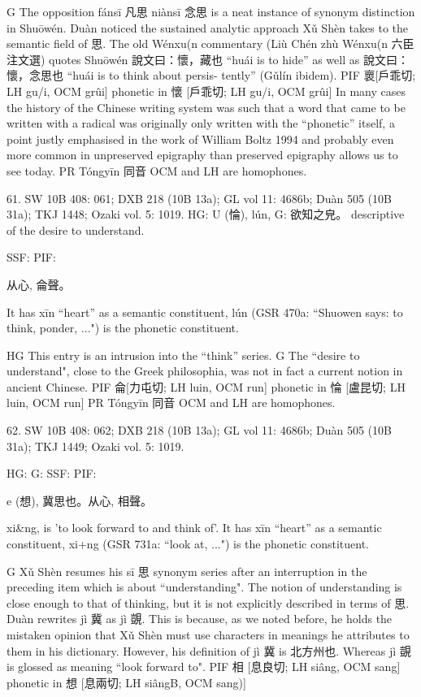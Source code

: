 G The opposition fánsī 凡思 niànsī 念思 is a neat instance of synonym distinction in Shuōwén. Duàn noticed the sustained analytic approach Xǔ Shèn takes to the semantic field of 思.
    The old Wénxu(n commentary (Liù Chén zhù Wénxu(n 六臣注文選) quotes Shuōwén 說文曰：懷，藏也 ``huái is to hide'' as well as 說文曰：懷，念思也 ``huái is to think about persis- tently'' (Gǔlín ibidem).
PIF     褱[戶乖切; LH gu/i, OCM grûi] phonetic in 懷 [戶乖切; LH gu/i, OCM grûi]
    In many cases the history of the Chinese writing system was such that a word that came to be written with a radical was originally only written with the ``phonetic'' itself, a point justly emphasised in the work of William Boltz 1994 and probably even more common in unpreserved epigraphy than preserved epigraphy allows us to see today.
PR   Tóngyīn 同音 OCM and LH are homophones.

61. SW 10B 408: 061; DXB 218 (10B 13a); GL vol 11: 4686b; Duàn 505 (10B 31a); TKJ 1448; Ozaki vol. 5: 1019.
HG:   U (惀),	lún,
G:	欲知之皃。 descriptive of the desire to understand.

SSF: PIF:

从心, 侖聲。

It has xīn ``heart'' as a semantic constituent,
lún (GSR 470a: ``Shuowen says: to think, ponder, ...") is the phonetic constituent.

HG This entry is an intrusion into the ``think'' series.
G	The ``desire to understand", close to the Greek philosophia, was not in fact a current notion in ancient Chinese.
PIF     侖[力屯切; LH luin, OCM run] phonetic in 惀 [盧昆切; LH luin, OCM run]
PR	Tóngyīn 同音 OCM and LH are homophones.



62. SW 10B 408: 062; DXB 218 (10B 13a); GL vol 11: 4686b; Duàn 505 (10B 31a); TKJ 1449; Ozaki vol. 5: 1019.


HG:
G: SSF: PIF:

e (想), 冀思也。从心,
相聲。


xi&ng,
is 'to look forward to and think of'.
It has xīn ``heart'' as a semantic constituent,
xi+ng (GSR 731a: ``look at, ...") is the phonetic constituent.

G Xǔ Shèn resumes his sī 思 synonym series after an interruption in the preceding item which is about ``understanding". The notion of understanding is close enough to that of thinking, but it is not explicitly described in terms of 思.
Duàn rewrites jì 冀 as jì 覬. This is because, as we noted before, he holds the mistaken
opinion that Xǔ Shèn must use characters in meanings he attributes to them in his dictionary. However, his definition of jì 冀 is 北方州也. Whereas jì 覬 is glossed as meaning ``look forward to".
PIF    相 [息良切; LH siâng, OCM sang] phonetic in 想 [息兩切; LH siângB, OCM sang)]

